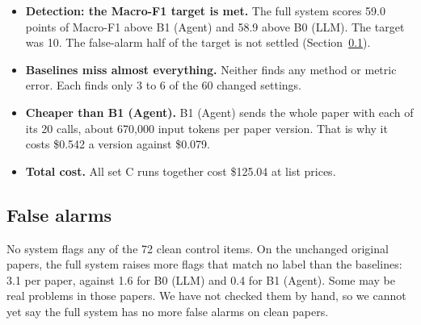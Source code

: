 \documentclass[11pt,a4paper]{article}
\begin{document}
\begin{itemize}
\item \textbf{Detection: the Macro-F1 target is met.} The full system scores 59.0 points of
Macro-F1 above B1 (Agent) and 58.9 above B0 (LLM). The target was 10. The false-alarm half of the
target is not settled (Section~\ref{sec:fa}).
\item \textbf{Baselines miss almost everything.} Neither finds any method or metric error. Each
finds only 3 to 6 of the 60 changed settings.
\item \textbf{Cheaper than B1 (Agent).} B1 (Agent) sends the whole paper with each of its 20 calls, about 670,000
input tokens per paper version. That is why it costs \$0.542 a version against \$0.079.
\item \textbf{Total cost.} All set C runs together cost \$125.04 at list prices.
\end{itemize}

\subsection{False alarms}\label{sec:fa}
No system flags any of the 72 clean control items. On the unchanged original papers, the full
system raises more flags that match no label than the baselines: 3.1 per paper, against 1.6 for
B0 (LLM) and 0.4 for B1 (Agent). Some may be real problems in those papers. We have not checked
them by hand, so we cannot yet say the full system has no more false alarms on clean papers.
\end{document}
